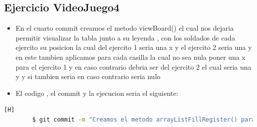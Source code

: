 \documentclass{article}
\begin{document}
	\subsection{Ejercicio VideoJuego4}
	\begin{itemize}	
		\item En el cuarto commit creamos el metodo viewBoard() el cual nos dejaria permitir visualizar la tabla junto a su leyenda , con los soldados de cada ejercito su posicion la cual del ejercito 1 seria una x y el ejercito 2 seria una y en este tambien aplicamos para cada casilla la cual no sea nula poner una x para el ejercito 1 y en caso contrario debria ser del ejercito 2 el cual seria una y y si tambien seria en caso contrario seria nulo
		\item El codigo , el commit y la ejecucion seria el siguiente:
	\end{itemize}	
	\begin{lstlisting}[language=bash,caption={Commit}][H]
		$ git commit -m "Creamos el metodo arrayListFillRegister() para que este pueda llenar los ArrayList que creamos para el ejercito 1 en este se creara un arraylist con casillas de soldados con datos nulos el cual se va ir llenando aleatoriamente con soldados y a la vez de esto nos mostrara por orden de creacion la informacion de los soldados a la vez tambien permitiriamos que cada casilla no se repita un mismo soldado ya que este sera verificado mediante si este casilla sea diferente a un soldado nulo"
	\end{lstlisting}	
\end{document}
